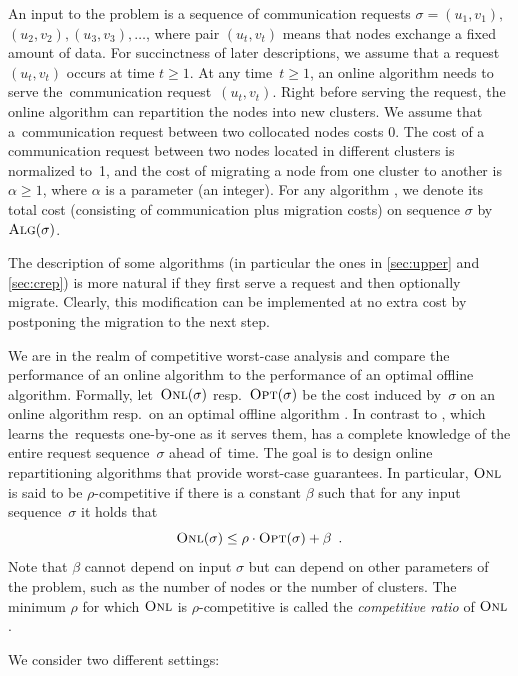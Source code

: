 An input to the problem is a sequence of communication requests $\sigma =
(u_1,v_1),$ $(u_2,v_2), (u_3,v_3), \ldots$, where pair $(u_t,v_t)$ means that
nodes exchange a fixed amount of data. For succinctness of later descriptions,
we assume that a request $(u_t,v_t)$ occurs at time $t \geq 1$. At any time~$t
\geq 1$, an online algorithm needs to serve the~communication
request~$(u_t,v_t)$. Right before serving the request, the online algorithm
can repartition the nodes into new clusters. We assume that
a~communication request between two collocated nodes costs 0. The cost of a
communication request between two nodes located in different clusters is
normalized to~1, and the cost of migrating a node from one cluster to another
is~$\alpha \geq 1$, where $\alpha$ is a parameter (an integer). For any
algorithm \ALG, we denote its total cost (consisting of communication plus
migration costs) on sequence $\sigma$ by $\textsc{Alg}(\sigma)$.

The description of some algorithms (in particular the ones in \ref{sec:upper}
and \ref{sec:crep}) is more natural if they first serve a request and then
optionally migrate. Clearly, this modification can be implemented at no extra cost by
postponing the migration to the next step.

We are in the realm of competitive worst-case analysis and compare the
performance of an online algorithm to the performance of an optimal offline
algorithm. Formally, let~$\textsc{Onl}(\sigma)$ resp.~$\textsc{Opt}(\sigma)$ be the cost
induced by~$\sigma$ on an online algorithm \ONL resp.~on an optimal offline
algorithm \OPT. In contrast to \ONL, which learns the~requests one-by-one as
it serves them, \OPT has a complete knowledge of the entire request
sequence~$\sigma$ ahead of~time. The goal is to design online repartitioning
algorithms that provide worst-case guarantees. In particular, $\textsc{Onl}$ is said
to be $\rho$-competitive if there is a constant $\beta$ such that for any
input sequence~$\sigma$ it holds that
\[
	\textsc{Onl}(\sigma) \leq \rho \cdot \textsc{Opt}(\sigma) + \beta 
	\enspace.
\]
Note that $\beta$ cannot depend on input $\sigma$ but can depend on other
parameters of the problem, such as the number of nodes or the number of clusters.
The minimum $\rho$ for which $\textsc{Onl}$ is $\rho$-competitive is called the 
\emph{competitive ratio} of $\textsc{Onl}$. 

We consider two different settings:

